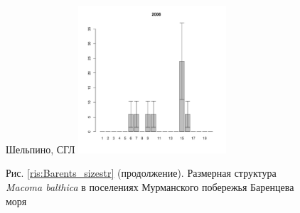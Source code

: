 \begin{figure}[h]
\begin{minipage}[b]{.46\linewidth}
	\end{minipage}
	\hfil %
	\begin{minipage}[b]{.46\linewidth}
	\begin{center}
	{\footnotesize Шельпино, СГЛ}
	\includegraphics[width=55mm]{../Barenc_Sea/Shel'pino/middle_2008_.pdf}
	\end{center}
	\end{minipage}
\begin{center}
Рис. \ref{ris:Barents_sizestr} (продолжение). Размерная структура {\it Macoma balthica} в поселениях Мурманского побережья Баренцева моря
\end{center}
\end{figure}

